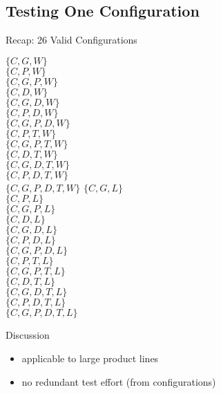 \subsection{Testing One Configuration}
\begin{frame}[b]{\myframetitle}
	\begin{mycolumns}[b]
		\centering\featureDiagramConfigurableDatabase
		
		\begin{example}{Recap: 26 Valid Configurations\mysource{\lecturemodeling}}
			\footnotesize
			\begin{mycolumns}[animation=none]
				$\{C,G,W\}$\\
				$\{C,P,W\}$\\
				$\{C,G,P,W\}$\\
				$\{C,D,W\}$\\
				$\{C,G,D,W\}$\\
				$\{C,P,D,W\}$\\
				$\{C,G,P,D,W\}$\\
				$\{C,P,T,W\}$\\
				$\{C,G,P,T,W\}$\\
				$\{C,D,T,W\}$\\
				$\{C,G,D,T,W\}$\\
				$\{C,P,D,T,W\}$\\
				\emph{$\{C,G,P,D,T,W\}$}
			\mynextcolumn
				$\{C,G,L\}$\\
				$\{C,P,L\}$\\
				$\{C,G,P,L\}$\\
				$\{C,D,L\}$\\
				$\{C,G,D,L\}$\\
				$\{C,P,D,L\}$\\
				$\{C,G,P,D,L\}$\\
				$\{C,P,T,L\}$\\
				$\{C,G,P,T,L\}$\\
				$\{C,D,T,L\}$\\
				$\{C,G,D,T,L\}$\\
				$\{C,P,D,T,L\}$\\
				$\{C,G,P,D,T,L\}$
			\end{mycolumns}
		\end{example}
	\mynextcolumn
		\pause\vspace{-10mm}
		\begin{note}{Discussion}
			\begin{itemize}
				\setlength\itemsep{.4em}
				\item applicable to large product lines
				\item no redundant test effort (from configurations)

\end{itemize}
\end{note}
\end{mycolumns}
\end{frame}
